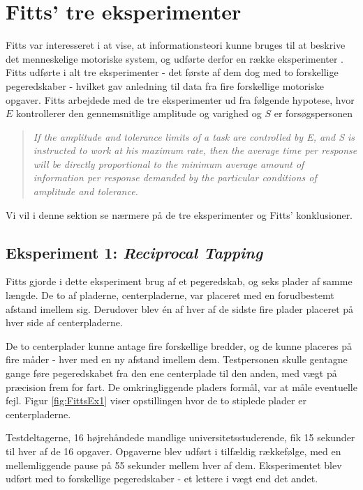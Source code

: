 \section*{Fitts' tre eksperimenter}
Fitts var interesseret i at vise, at informationsteori kunne bruges til at beskrive det menneskelige motoriske system, og udførte derfor en række eksperimenter \cite{fitts1954}. Fitts udførte i alt tre eksperimenter - det første af dem dog med to forskellige pegeredskaber - hvilket gav anledning til data fra fire forskellige motoriske opgaver. Fitts arbejdede med de tre eksperimenter ud fra følgende hypotese, hvor $E$ kontrollerer den gennemsnitlige amplitude og varighed \cite{fitts1954} og $S$ er forsøgspersonen
\begin{quotation}
\textit{If the amplitude and tolerance limits of a task are controlled by E, and S is instructed to work at his maximum rate, then the average time per response will be directly proportional to the minimum average amount of information per response demanded by the particular conditions of amplitude and tolerance. \cite{fitts1954}}
\end{quotation}
Vi vil i denne sektion se nærmere på de tre eksperimenter og Fitts' konklusioner.

\subsection*{Eksperiment 1: \textit{Reciprocal Tapping}}
Fitts gjorde i dette eksperiment brug af et pegeredskab, og seks plader af samme længde. De to af pladerne, centerpladerne, var placeret med en forudbestemt afstand imellem sig. Derudover blev én af hver af de sidste fire plader placeret på hver side af centerpladerne.

De to centerplader kunne antage fire forskellige bredder, og de kunne placeres på fire måder - hver med en ny afstand imellem dem. Testpersonen skulle gentagne gange føre pegeredskabet fra den ene centerplade til den anden, med vægt på præcision frem for fart. De omkringliggende pladers formål, var at måle eventuelle fejl. Figur \ref{fig:FittsEx1} viser opstillingen hvor de to stiplede plader er centerpladerne.

Testdeltagerne, 16 højrehåndede mandlige universitetsstuderende, fik 15 sekunder til hver af de 16 opgaver. Opgaverne blev udført i tilfældig rækkefølge, med en mellemliggende pause på 55 sekunder mellem hver af dem. Eksperimentet blev udført med to forskellige pegeredskaber - et lettere i vægt end det andet.

